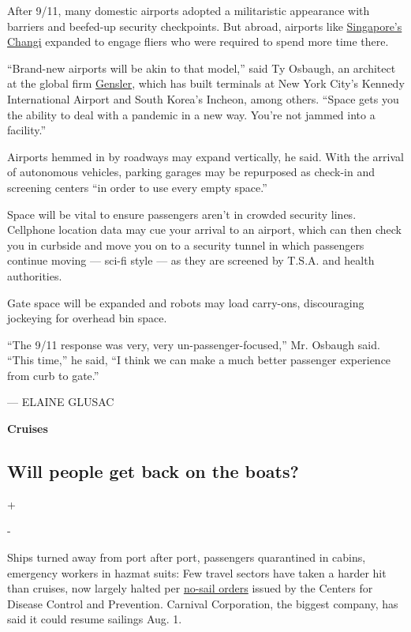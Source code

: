 After 9/11, many domestic airports adopted a militaristic appearance
with barriers and beefed-up security checkpoints. But abroad, airports
like
\href{https://www.nytimes3xbfgragh.onion/2019/12/02/travel/Singapore-Changi-Airport.html}{Singapore's
Changi} expanded to engage fliers who were required to spend more time
there.

``Brand-new airports will be akin to that model,'' said Ty Osbaugh, an
architect at the global firm \href{https://www.gensler.com/}{Gensler},
which has built terminals at New York City's Kennedy International
Airport and South Korea's Incheon, among others. ``Space gets you the
ability to deal with a pandemic in a new way. You're not jammed into a
facility.''

Airports hemmed in by roadways may expand vertically, he said. With the
arrival of autonomous vehicles, parking garages may be repurposed as
check-in and screening centers ``in order to use every empty space.''

Space will be vital to ensure passengers aren't in crowded security
lines. Cellphone location data may cue your arrival to an airport, which
can then check you in curbside and move you on to a security tunnel in
which passengers continue moving --- sci-fi style --- as they are
screened by T.S.A. and health authorities.

Gate space will be expanded and robots may load carry-ons, discouraging
jockeying for overhead bin space.

``The 9/11 response was very, very un-passenger-focused,'' Mr. Osbaugh
said. ``This time,'' he said, ``I think we can make a much better
passenger experience from curb to gate.''

--- ELAINE GLUSAC

\textbf{Cruises}

\hypertarget{will-people-get-back-on-the-boats}{%
\subsection{Will people get back on the
boats?}\label{will-people-get-back-on-the-boats}}

+

-

Ships turned away from port after port, passengers quarantined in
cabins, emergency workers in hazmat suits: Few travel sectors have taken
a harder hit than cruises, now largely halted per
\href{https://www.federalregister.gov/documents/2020/04/15/2020-07930/no-sail-order-and-suspension-of-further-embarkation-notice-of-modification-and-extension-and-other}{no-sail
orders} issued by the Centers for Disease Control and Prevention.
Carnival Corporation, the biggest company, has said it could resume
sailings Aug. 1.

